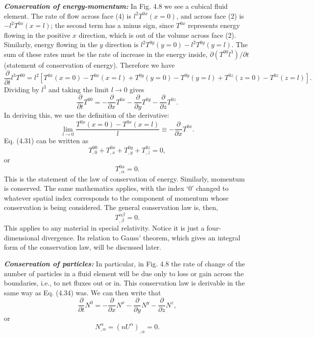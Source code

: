 \documentclass[12pt]{book}
\begin{document}
    \textbf{\textit{Conservation of energy-momentum:}}
    In Fig. 4.8 we see a cubical fluid element. The rate of flow across face (4) is \(l^2 T^{0x}(x = 0)\), and across face (2) is \(-l^2 T^{0x}(x = l)\); the second term has a minus sign, since \(T^{0x}\) represents energy flowing in the positive \(x\) direction, which is out of the volume across face (2). Similarly, energy flowing in the \(y\) direction is \(l^2 T^{0y}(y = 0) - l^2 T^{0y}(y = l)\). The sum of these rates must be the rate of increase in the energy inside, \(\partial(T^{00} l^3)/\partial t\) (statement of conservation of energy). Therefore we have
    \[
    \frac{\partial}{\partial t} l^3 T^{00} = l^2 \left[ T^{0x}(x = 0) - T^{0x}(x = l) + T^{0y}(y = 0) - T^{0y}(y = l) + T^{0z}(z = 0) - T^{0z}(z = l) \right]. \tag{4.30}
    \]
    Dividing by \(l^3\) and taking the limit \(l \to 0\) gives
    \[
    \frac{\partial}{\partial t} T^{00} = - \frac{\partial}{\partial x} T^{0x} - \frac{\partial}{\partial y} T^{0y} - \frac{\partial}{\partial z} T^{0z}. \tag{4.31}
    \]
    In deriving this, we use the definition of the derivative:
    \[
    \lim_{l \to 0} \frac{T^{0x}(x = 0) - T^{0x}(x = l)}{l} \equiv - \frac{\partial}{\partial x} T^{0x}. \tag{4.32}
    \]
    Eq. (4.31) can be written as
    \[
    T^{00}_{,0} + T^{0x}_{,x} + T^{0y}_{,y} + T^{0z}_{,z} = 0,
    \]
    or
    \[
    T^{0\alpha}_{,\alpha} = 0. \tag{4.33}
    \]
    This is the statement of the law of conservation of energy. Similarly, momentum is conserved. The same mathematics applies, with the index ‘0’ changed to whatever spatial index corresponds to the component of momentum whose conservation is being considered. The general conservation law is, then,
    \[
    T^{\alpha\beta}_{,\beta} = 0. \tag{4.34}
    \]
    This applies to any material in special relativity. Notice it is just a four-dimensional divergence. Its relation to Gauss’ theorem, which gives an integral form of the conservation law, will be discussed later.

    \textbf{\textit{Conservation of particles:}}
    In particular, in Fig. 4.8 the rate of change of the number of particles in a fluid element will be due only to loss or gain across the boundaries, i.e., to net fluxes out or in. This conservation law is derivable in the same way as Eq. (4.34) was. We can then write that
    \[
    \frac{\partial}{\partial t} N^0 = - \frac{\partial}{\partial x} N^x - \frac{\partial}{\partial y} N^y - \frac{\partial}{\partial z} N^z,
    \]
    or
    \[
    N^{\alpha}_{,\alpha} = (n U^\alpha)_{,\alpha} = 0. \tag{4.35}
    \]
\end{document}

